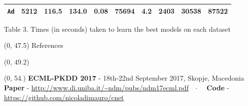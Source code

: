\documentclass[final]{beamer}
\begin{document}
\begin{frame}{}
\begin{textblock}{17.5}
\begin{minipage}{1.0\linewidth}
\begin{table}[t]
\begin{tabular}{l rrr r r r r r r}
      \texttt{Ad}&5212&116.5&134.0&	0.08&75694&4.2&2403 & 30538 &87522\\ 
      \bottomrule
    \end{tabular}
    \label{tab:exptimes}
  \end{table}
  \hspace{50pt}\begin{minipage}{0.8\linewidth} \scriptsize Table
    3. Times (in seconds) taken to learn the best models on each
    dataset
  \end{minipage}
\end{minipage}

  \end{textblock}


  


  
  \begin{textblock}{80}(0, 47.5)
    References
  \end{textblock}


 \setlength{\columnsep}{3cm}
 \begin{textblock}{58.5}(0, 49.2)
   \small
   \begin{multicols}{3}
    \setlength\bibitemsep{8pt}
    \printbibliography[heading=none]
    \end{multicols}
  \end{textblock}




  



  \begin{textblock}{78}(0, 54.)
    \small
    \textbf{ECML-PKDD 2017}  -  18th-22nd September 2017, Skopje,
    Macedonia\hfill
    \textbf{Paper} - 
    {\url{http://www.di.uniba.it/~ndm/pubs/ndm17ecml.pdf}}\ \ $\cdotp$ \ \
        \textbf{Code} - 
    {\url{https://github.com/nicoladimauro/cnet}}
  \end{textblock}
  
\end{frame}
\end{document}
